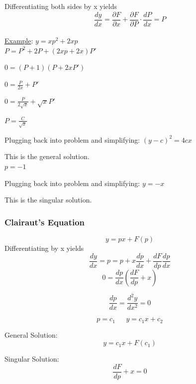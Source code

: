 \documentclass[12pt]{article}
\numberwithin{equation}{subsection}
\newcommand{\parx}[1]{\frac{\partial #1}{\partial x}}
\newcommand{\derx}[1]{\frac{d #1}{dx}}
\newcommand{\deryx}{\frac{dy}{dx}}
\newcommand{\indb}{\hspace{1cm}}
\newcommand{\indd}{\hspace{2cm}}
\newcommand{\exa}{\noindent \underline{Example}: \hspace{1cm}}
\begin{document}
Differentiating both sides by x yields 
\begin{equation}
\deryx= \parx{F}+\frac{\partial F}{\partial P} \cdot \derx{P}=P
\end{equation}\\

\exa $y=xp^2+2xp$\\

\indb $P=P^2+2P+(2xp+2x)P'$

\indb $0=(P+1)(P+2xP')$

\indd $0=\frac{P}{2x}+P'$

\indd $0=\frac{P}{2\sqrt{x}}+\sqrt{x}P'$

\indd $P=\frac{C}{\sqrt{x}}$

Plugging back into problem and simplifying: $(y-c)^2=4cx$

\indd This is the general solution.\\

\indd $p=-1$

Plugging back into problem and simplifying: $y=-x$

\indd This is the singular solution.\\

\subsubsection{Clairaut's Equation}
\begin{equation}
y=px+F(p)
\end{equation}
Differentiating by x yields 
\begin{equation}
\deryx = p = p + x \derx{p} + \frac{dF}{dp} \derx{p} 
\end{equation}
\begin{equation}
0=\derx{p}\left(\frac{dF}{dp}+x\right)
\end{equation}

\begin{equation}
\derx{p}=\frac{d^2y}{dx^2}=0
\end{equation}

\begin{equation}
p=c_1 \ \ \ \ \ \ \ y=c_1x+c_2
\end{equation}

General Solution:
\begin{equation}
y=c_1x+F(c_1)
\end{equation}

Singular Solution:
\begin{equation}
\frac{dF}{dp}+x=0
\end{equation}
\end{document}
